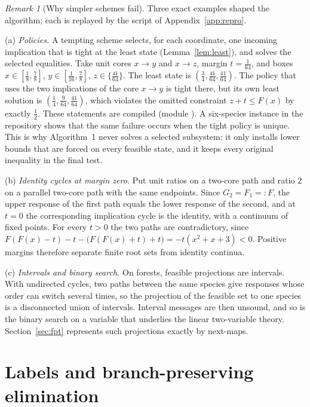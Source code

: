 \documentclass[11pt,a4paper]{article}
\theoremstyle{plain}
\theoremstyle{definition}
\theoremstyle{remark}
\newtheorem{remark}[theorem]{Remark}
\begin{document}
\begin{remark}[Why simpler schemes fail]\label{rem:failures}
Three exact examples shaped the algorithm; each is replayed by the script of Appendix~\ref{app:repro}.

(a) \emph{Policies.} A tempting scheme selects, for each coordinate, one incoming implication that is tight at the least state (Lemma~\ref{lem:least}), and solves the selected equalities. Take unit cores $x\to y$ and $x\to z$, margin $t=\tfrac1{64}$, and boxes $x\in[\tfrac18,\tfrac78]$, $y\in[\tfrac1{16},\tfrac78]$, $z\in\{\tfrac{41}{64}\}$. The least state is $(\tfrac34,\tfrac{41}{64},\tfrac{41}{64})$. The policy that uses the two implications of the core $x\to y$ is tight there, but its own least solution is $(\tfrac14,\tfrac9{64},\tfrac{41}{64})$, which violates the omitted constraint $z+t\le F(x)$ by exactly $\tfrac12$. These statements are compiled (module ). A six-species instance in the repository shows that the same failure occurs when the tight policy is unique. This is why Algorithm~1 never solves a selected subsystem: it only installs lower bounds that are forced on every feasible state, and it keeps every original inequality in the final test.

(b) \emph{Identity cycles at margin zero.} Put unit ratios on a two-core path and ratio $2$ on a parallel two-core path with the same endpoints. Since $G_2=F_1=:F$, the upper response of the first path equals the lower response of the second, and at $t=0$ the corresponding implication cycle is the identity, with a continuum of fixed points. For every $t>0$ the two paths are contradictory, since $F(F(x)-t)-t-\bigl(F(F(x)+t)+t\bigr)=-t(x^2+x+3)<0$. Positive margins therefore separate finite root sets from identity continua.

(c) \emph{Intervals and binary search.} On forests, feasible projections are intervals. With undirected cycles, two paths between the same species give responses whose order can switch several times, so the projection of the feasible set to one species is a disconnected union of intervals. Interval messages are then unsound, and so is the binary search on a variable that underlies the linear two-variable theory. Section~\ref{sec:fpt} represents such projections exactly by next-maps.
\end{remark}

\section{Labels and branch-preserving elimination}\label{sec:elimination}
\end{document}
